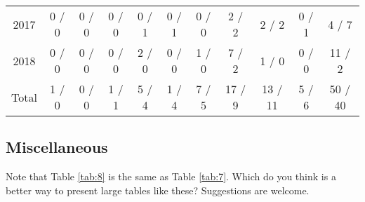 \documentclass[a4paper]{article}
\begin{document}
\begin{table}
{\begin{tabular}[t]{ccccccccccc}
\hspace{1em}2017 & 0 / 0 & 0 / 0 & 0 / 0 & 0 / 1 & 0 / 1 & 0 / 0 & 2 / 2 & 2 / 2 & 0 / 1 & 4 / 7\\
\hspace{1em}2018 & 0 / 0 & 0 / 0 & 0 / 0 & 2 / 0 & 0 / 0 & 1 / 0 & 7 / 2 & 1 / 0 & 0 / 0 & 11 / 2\\
\hspace{1em}Total & 1 / 0 & 0 / 0 & 1 / 1 & 5 / 4 & 1 / 4 & 7 / 5 & 17 / 9 & 13 / 11 & 5 / 6 & 50 / 40\\
\bottomrule
\end{tabular}}
\end{table}

\hypertarget{miscellaneous}{%
\subsection{Miscellaneous}\label{miscellaneous}}

Note that Table \ref{tab:8} is the same as Table \ref{tab:7}. Which do
you think is a better way to present large tables like these?
Suggestions are welcome.
\end{document}
